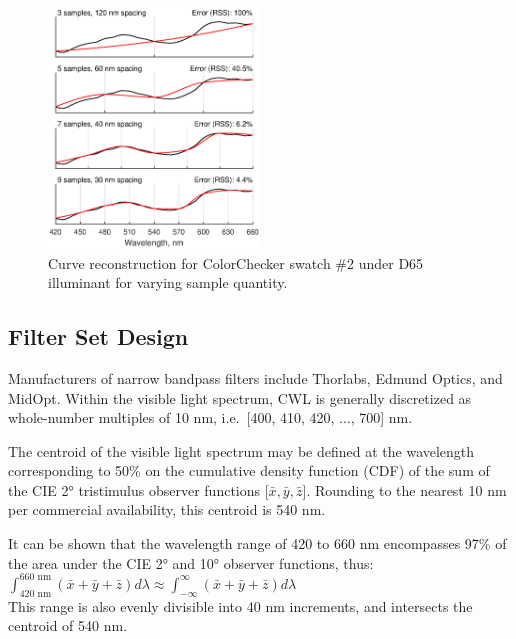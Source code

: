 \documentclass[twocolumn,10pt]{asme2ej}
\newcommand{\id}{\hspace{6 mm}}
\begin{document}
\begin{figure}
\centering
\includegraphics[width=0.5\textwidth]{curve_reconstruction_colorchecker_2.eps}
\caption{Curve reconstruction for ColorChecker swatch \#2 under D65 illuminant for varying sample quantity.}
\label{curve_reconstruction_colorchecker_2}
\end{figure}

\subsection{Filter Set Design}

\label{section_filters}

Manufacturers of narrow bandpass filters include Thorlabs, Edmund Optics, and MidOpt. Within the visible light spectrum, CWL is generally discretized as whole-number multiples of 10 nm, i.e.\ [400, 410, 420, ..., 700] nm.

\id The centroid of the visible light spectrum may be defined at the wavelength corresponding to 50\% on the cumulative density function (CDF) of the sum of the CIE 2° tristimulus observer functions [$\bar{x}, \bar{y}, \bar{z}$]. \cite{CVRL} Rounding to the nearest 10 nm per commercial availability, this centroid is 540 nm.

\id It can be shown that the wavelength range of 420 to 660 nm encompasses 97\% of the area under the CIE 2° and 10° observer functions, \cite{CVRL} thus:\\

$ \displaystyle \int_{\textrm{420 nm}}^{\textrm{660 nm}} ( \bar{x}+\bar{y}+\bar{z} ) d\lambda \approx \int_{-\infty}^{\infty} ( \bar{x}+\bar{y}+\bar{z} ) d\lambda $ \\

This range is also evenly divisible into 40 nm increments, and intersects the centroid of 540 nm.
\end{document}
